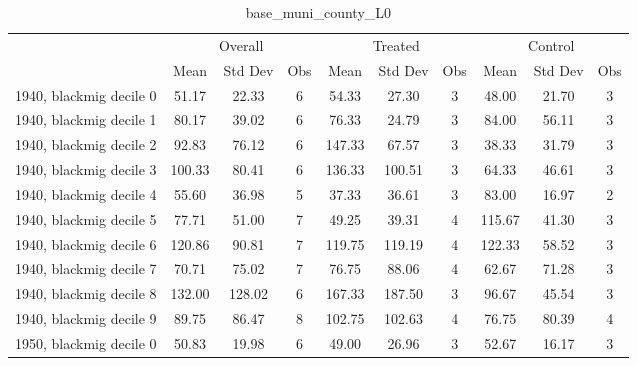\begin{table}[htbp]\centering
\def\sym#1{\ifmmode^{#1}\else\(^{#1}\)\fi}
\caption{base\_muni\_county\_L0 \label{tab1}}
\begin{tabular}{l*{3}{ccc}}
\toprule
                    &\multicolumn{3}{c}{Overall}           &\multicolumn{3}{c}{Treated}           &\multicolumn{3}{c}{Control}           \\
                    &        Mean&     Std Dev&         Obs&        Mean&     Std Dev&         Obs&        Mean&     Std Dev&         Obs\\
\midrule
1940, blackmig decile 0&       51.17&       22.33&           6&       54.33&       27.30&           3&       48.00&       21.70&           3\\
1940, blackmig decile 1&       80.17&       39.02&           6&       76.33&       24.79&           3&       84.00&       56.11&           3\\
1940, blackmig decile 2&       92.83&       76.12&           6&      147.33&       67.57&           3&       38.33&       31.79&           3\\
1940, blackmig decile 3&      100.33&       80.41&           6&      136.33&      100.51&           3&       64.33&       46.61&           3\\
1940, blackmig decile 4&       55.60&       36.98&           5&       37.33&       36.61&           3&       83.00&       16.97&           2\\
1940, blackmig decile 5&       77.71&       51.00&           7&       49.25&       39.31&           4&      115.67&       41.30&           3\\
1940, blackmig decile 6&      120.86&       90.81&           7&      119.75&      119.19&           4&      122.33&       58.52&           3\\
1940, blackmig decile 7&       70.71&       75.02&           7&       76.75&       88.06&           4&       62.67&       71.28&           3\\
1940, blackmig decile 8&      132.00&      128.02&           6&      167.33&      187.50&           3&       96.67&       45.54&           3\\
1940, blackmig decile 9&       89.75&       86.47&           8&      102.75&      102.63&           4&       76.75&       80.39&           4\\
1950, blackmig decile 0&       50.83&       19.98&           6&       49.00&       26.96&           3&       52.67&       16.17&           3\\

\end{tabular}
\end{table}
